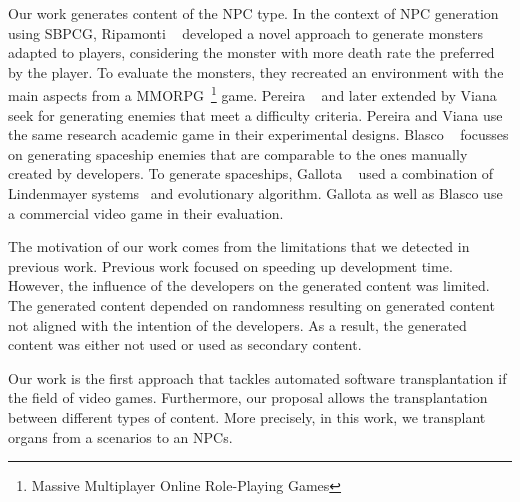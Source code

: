 Our work generates content of the NPC type. In the context of NPC generation using SBPCG, Ripamonti \etal~\cite{ripamonti2021dragon} developed a novel approach to generate monsters adapted to players, considering the monster with more death rate the preferred by the player. To evaluate the monsters, they recreated an environment with the main aspects from a MMORPG~\footnote{Massive Multiplayer Online Role-Playing Games} game. Pereira \etal~\cite{pereira2021procedural_enemies} and later extended by Viana \etal~\cite{viana2022illuminating} seek for generating enemies that meet a difficulty criteria. Pereira \etal and Viana \etal use the same research academic game in their experimental designs. 
Blasco \etal~\cite{blasco2021evolutionary} focusses on generating spaceship enemies that are comparable to the ones manually created by developers. To generate spaceships, Gallota \etal~\cite{gallotta2022evolving} used a combination of Lindenmayer systems~\cite{lindenmayer1968mathematical} and evolutionary algorithm. Gallota \etal as well as Blasco \etal use a commercial video game in their evaluation.



The motivation of our work comes from the limitations that we detected in previous work. Previous work focused on speeding up development time. However, the influence of the developers on the generated content was limited. The generated content depended on randomness resulting on generated content not aligned with the intention of the developers. As a result, the generated content was either not used or used as secondary content. 

Our work is the first approach that tackles automated software transplantation if the field of video games. Furthermore, our proposal allows the transplantation between different types of content. More precisely, in this work, we transplant organs from a scenarios to an NPCs.


